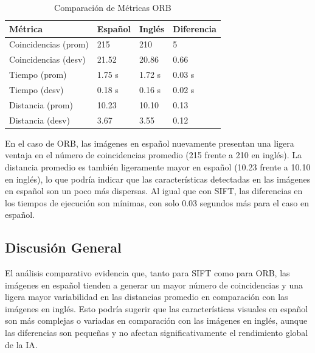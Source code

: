 \documentclass[unnumsec,webpdf,modern,large]{mam-authoring-template}
\theoremstyle{thmstyleone}%
\theoremstyle{thmstyletwo}%
\theoremstyle{thmstylethree}%
\begin{document}
\begin{table}[h!]
    \centering
    \caption{Comparación de Métricas ORB}
    \begin{tabular}{ | m{5.5em} | m{1.5cm} | m{1.5cm} | m{1.5cm} | }
        \hline
        \textbf{Métrica} & \textbf{Español} & \textbf{Inglés} & \textbf{Diferencia} \\ 
        \hline
        Coincidencias (prom) & 215 & 210 & 5 \\ 
        \hline
        Coincidencias (desv) & 21.52 & 20.86 & 0.66 \\ 
        \hline
        Tiempo (prom) & 1.75 s & 1.72 s & 0.03 s \\ 
        \hline
        Tiempo (desv) & 0.18 s & 0.16 s & 0.02 s \\ 
        \hline
        Distancia (prom) & 10.23 & 10.10 & 0.13 \\ 
        \hline
        Distancia (desv) & 3.67 & 3.55 & 0.12 \\ 
        \hline
    \end{tabular}
    \label{tab:comparacion_orb}
\end{table}

En el caso de ORB, las imágenes en español nuevamente presentan una ligera ventaja en el número de coincidencias promedio (215 frente a 210 en inglés). La distancia promedio es también ligeramente mayor en español (10.23 frente a 10.10 en inglés), lo que podría indicar que las características detectadas en las imágenes en español son un poco más dispersas. Al igual que con SIFT, las diferencias en los tiempos de ejecución son mínimas, con solo 0.03 segundos más para el caso en español.

\subsection{Discusión General}

El análisis comparativo evidencia que, tanto para SIFT como para ORB, las imágenes en español tienden a generar un mayor número de coincidencias y una ligera mayor variabilidad en las distancias promedio en comparación con las imágenes en inglés. Esto podría sugerir que las características visuales en español son más complejas o variadas en comparación con las imágenes en inglés, aunque las diferencias son pequeñas y no afectan significativamente el rendimiento global de la IA.
\end{document}
